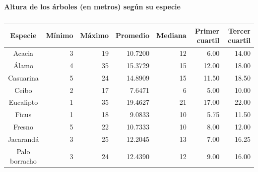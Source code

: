 \documentclass[11pt]{article}
\begin{document}
\begin{table}[h!]
  \begin{center}
    \caption*{\textbf{Altura de los árboles (en metros) según su especie}}
    \begin{tabular}{| c | r | r | r | r | r | r |}
      \hline
      \textbf{Especie} & \textbf{Mínimo}         & \textbf{Máximo}         & \textbf{Promedio} &
      \textbf{Mediana} & \textbf{Primer cuartil} & \textbf{Tercer cuartil}                                          \\ \hline
      Acacia           & 3                       & 19                      & 10.7200           & 12 & 6.00  & 14.00 \\ \hline
      Álamo            & 4                       & 35                      & 15.3729           & 15 & 12.00 & 18.00 \\ \hline
      Casuarina        & 5                       & 24                      & 14.8909           & 15 & 11.50 & 18.50 \\ \hline
      Ceibo            & 2                       & 17                      & 7.6471            & 6  & 5.00  & 10.00 \\ \hline
      Eucalipto        & 1                       & 35                      & 19.4627           & 21 & 17.00 & 22.00 \\ \hline
      Ficus            & 1                       & 18                      & 9.0833            & 10 & 5.75  & 11.50 \\ \hline
      Fresno           & 5                       & 22                      & 10.7333           & 10 & 8.00  & 12.00 \\ \hline
      Jacarandá        & 3                       & 25                      & 12.2045           & 13 & 7.00  & 16.25 \\ \hline
      Palo borracho    & 3                       & 24                      & 12.4390           & 12 & 9.00  & 16.00 \\ \hline
    \end{tabular}
    \caption{}
    \label{tab:tablaAlturaEspecie}
  \end{center}
\end{table}
\end{document}
